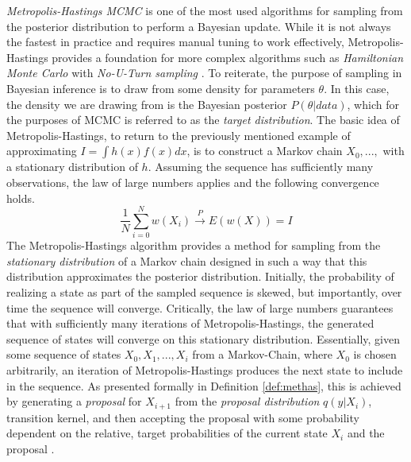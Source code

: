 \documentclass[
  12pt,
]{book}
\theoremstyle{definition}
\theoremstyle{definition}
\theoremstyle{definition}
\theoremstyle{remark}
\begin{document}
\emph{Metropolis-Hastings MCMC} is one of the most used algorithms for sampling from the posterior distribution to perform a Bayesian update.
While it is not always the fastest in practice and requires manual tuning to work effectively, Metropolis-Hastings provides a foundation for more complex algorithms such as \emph{Hamiltonian Monte Carlo} \citep{Brooks2011} with \emph{No-U-Turn sampling} \citep{Homan2014}.
To reiterate, the purpose of sampling in Bayesian inference is to draw from some density for parameters \(\theta\).
In this case, the density we are drawing from is the Bayesian posterior \(P(\theta|data)\), which for the purposes of MCMC is referred to as the \emph{target distribution}.
The basic idea of Metropolis-Hastings, to return to the previously mentioned example of approximating \(I=\int h(x)f(x)dx\), is to construct a Markov chain \(X_0,...,\) with a stationary distribution of \(h\).
Assuming the sequence has sufficiently many observations, the law of large numbers applies and the following convergence holds.
\[\frac{1}{N}\sum_{i=0}^{N}w(X_{i})\xrightarrow{P} E(w(X))=I\]
The Metropolis-Hastings algorithm provides a method for sampling from the \emph{stationary distribution} of a Markov chain designed in such a way that this distribution approximates the posterior distribution.
Initially, the probability of realizing a state as part of the sampled sequence is skewed, but importantly, over time the sequence will converge.
Critically, the law of large numbers guarantees that with sufficiently many iterations of Metropolis-Hastings, the generated sequence of states will converge on this stationary distribution.
Essentially, given some sequence of states \(X_{0},X_{1},...,X_{i}\) from a Markov-Chain, where \(X_{0}\) is chosen arbitrarily, an iteration of Metropolis-Hastings produces the next state to include in the sequence.
As presented formally in Definition \ref{def:methas}, this is achieved by generating a \emph{proposal} for \(X_{i+1}\) from the \emph{proposal distribution} \(q(y|X_{i})\), transition kernel, and then accepting the proposal with some probability dependent on the relative, target probabilities of the current state \(X_{i}\) and the proposal \citep{Wasserman2004}.
\end{document}
